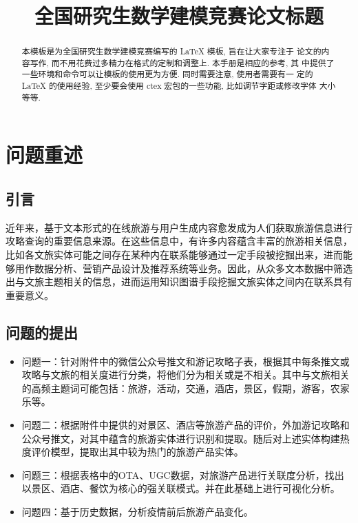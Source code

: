 \documentclass[bwprint]{gmcmthesis}
\title{全国研究生数学建模竞赛论文标题}
\begin{document}
 \maketitle

\begin{abstract}
本模板是为全国研究生数学建模竞赛编写的 \LaTeX{} 模板, 旨在让大家专注于
论文的内容写作, 而不用花费过多精力在格式的定制和调整上. 本手册是相应的参考, 其
中提供了一些环境和命令可以让模板的使用更为方便. 同时需要注意, 使用者需要有一
定的 \LaTeX{} 的使用经验, 至少要会使用 ctex 宏包的一些功能, 比如调节字距或修改字体
大小等等.


\end{abstract}

\pagestyle{plain}


\section{问题重述}

\subsection{引言}

近年来，基于文本形式的在线旅游与用户生成内容愈发成为人们获取旅游信息进行攻略查询的重要信息来源。在这些信息中，有许多内容蕴含丰富的旅游相关信息，比如各文旅实体可能之间存在某种内在联系能够通过一定手段被挖掘出来，进而能够用作数据分析、营销产品设计及推荐系统等业务。因此，从众多文本数据中筛选出与文旅主题相关的信息，进而运用知识图谱手段挖掘文旅实体之间内在联系具有重要意义。

\subsection{问题的提出}

\begin{itemize}
	\item 问题一：针对附件中的微信公众号推文和游记攻略子表，根据其中每条推文或攻略与文旅的相关度进行分类，将他们分为相关或是不相关。其中与文旅相关的高频主题词可能包括：旅游，活动，交通，酒店，景区，假期，游客，农家乐等。
 
	\item 问题二：根据附件中提供的对景区、酒店等旅游产品的评价，外加游记攻略和公众号推文，对其中蕴含的旅游实体进行识别和提取。随后对上述实体构建热度评价模型，提取出其中较为热门的旅游产品实体。
 
	\item 问题三：根据表格中的OTA、UGC数据，对旅游产品进行关联度分析，找出以景区、酒店、餐饮为核心的强关联模式。并在此基础上进行可视化分析。
 
	\item 问题四：基于历史数据，分析疫情前后旅游产品变化。
\end{itemize}
\end{document}
